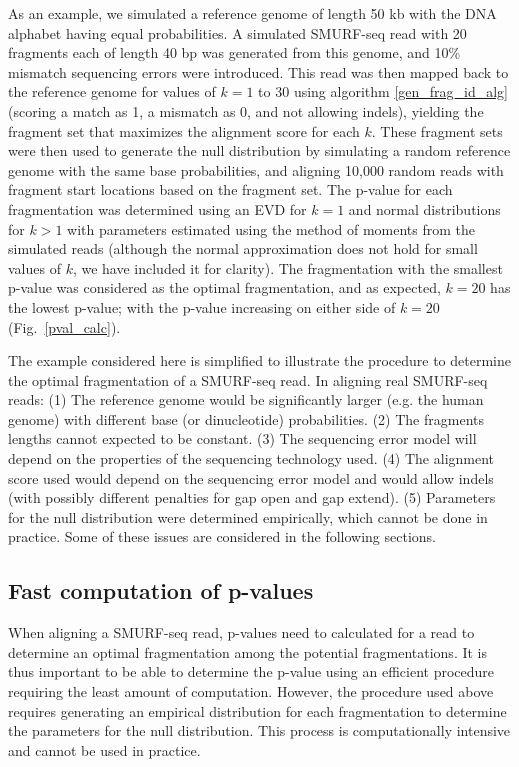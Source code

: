 As an example, we simulated a reference genome of length 50 kb with the
DNA alphabet having equal probabilities.
%
A simulated SMURF-seq read with 20 fragments each of length 40 bp was
generated from this genome, and 10\% mismatch sequencing errors were
introduced.
%
This read was then mapped back to the reference genome for values of $k
= 1$ to $30$ using algorithm \ref{gen_frag_id_alg} (scoring a match as
1, a mismatch as 0, and not allowing indels), yielding the fragment set
that maximizes the alignment score for each $k$.
%
These fragment sets were then used to generate the null distribution by
simulating a random reference genome with the same base probabilities,
and aligning 10,000 random reads with fragment start locations based on
the fragment set.
%
The p-value for each fragmentation was determined using an EVD for $k=1$
and normal distributions for $k > 1$ with parameters estimated using the
method of moments from the simulated reads (although the normal
approximation does not hold for small values of $k$, we have included it
for clarity).
%
The fragmentation with the smallest p-value was considered as the
optimal fragmentation, and as expected, $k = 20$ has the lowest p-value;
with the p-value increasing on either side of $k = 20$
(Fig.~\ref{pval_calc}).

The example considered here is simplified to illustrate the procedure
to determine the optimal fragmentation of a SMURF-seq read. In aligning
real SMURF-seq reads: (1) The reference genome would be significantly
larger (e.g. the human genome) with different base (or dinucleotide)
probabilities. (2) The fragments lengths cannot expected to be constant.
(3) The sequencing error model will depend on the properties of the
sequencing technology used. (4) The alignment score used would depend on
the sequencing error model and would allow indels (with possibly
different penalties for gap open and gap extend). (5) Parameters for the
null distribution were determined empirically, which cannot be done in
practice. Some of these issues are considered in the following sections.

\subsection{Fast computation of p-values}
\label{fast_pval_comp}
When aligning a SMURF-seq read, p-values need to calculated for a read
to determine an optimal fragmentation among the potential
fragmentations. It is thus important to be able to determine the p-value
using an efficient procedure requiring the least amount of computation.
%
However, the procedure used above requires generating an empirical
distribution for each fragmentation to determine the parameters for the
null distribution. This process is computationally intensive and cannot
be used in practice.

